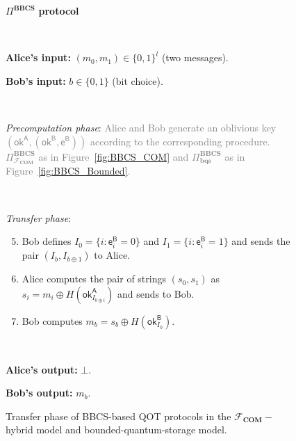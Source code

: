 \begin{figure}[h!]
    \centering
        \begin{tcolorbox}
            
            \centerline{$\Pi^{\textbf{BBCS}}$ \textbf{protocol}}
            
            \
            
            \textbf{Alice's input:} $(m_0, m_1)\in\{0,1\}^l$ (two messages). 
            
            \textbf{Bob's input:} $b\in\{0,1\}$ (bit choice).
            
            \
            

            
            \textit{Precomputation phase}: \textcolor{gray}{Alice and Bob generate an oblivious key $(\mathsf{ok}^{\mathsf{A}}, (\mathsf{ok}^{\mathsf{B}}, \mathsf{e}^{\mathsf{B}}))$ according to the corresponding procedure. $\Pi^{\textbf{BBCS}}_{\mathcal{F}_{\textbf{COM}}}$ as in Figure~\ref{fig:BBCS_COM} and $\Pi^{\textbf{BBCS}}_{\textbf{bqs}}$ as in Figure~\ref{fig:BBCS_Bounded}.}
            
            \
            
            \textit{Transfer phase}:
            \begin{enumerate}
            \setcounter{enumi}{4}
                \item Bob defines $I_0 = \{ i : \mathsf{e}^{\mathsf{B}}_i = 0 \}$ and $I_1 = \{ i : \mathsf{e}^{\mathsf{B}}_i = 1 \}$ and sends the pair $(I_b, I_{b\oplus 1})$ to Alice.
                \item Alice computes the pair of strings $(s_0, s_1)$ as $s_i = m_i \oplus H(\mathsf{ok}^{\mathsf{A}}_{I_{b\oplus i}})$ and sends to Bob.
                \item Bob computes $m_b = s_b \oplus  H(\mathsf{ok}^{\mathsf{B}}_{I_0})$. 
            \end{enumerate}
            
            \
            
        \textbf{Alice's output:} $\bot$.
        
        \textbf{Bob's output:} $m_b$.
        
        \end{tcolorbox}
    \caption{Transfer phase of BBCS-based QOT protocols in the $\mathcal{F}_{\mathbf{COM}}-$hybrid model and bounded-quantum-storage model.}
    \label{fig:BBCS_Transfer}
\end{figure}

